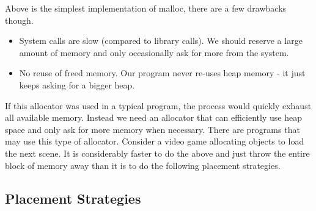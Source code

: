 Above is the simplest implementation of malloc, there are a few drawbacks though.

\begin{itemize}
\item System calls are slow (compared to library calls). We should reserve a large amount of memory and only occasionally ask for more from the system.
\item No reuse of freed memory. Our program never re-uses heap memory - it just keeps asking for a bigger heap.
\end{itemize}

If this allocator was used in a typical program, the process would quickly exhaust all available memory.
Instead we need an allocator that can efficiently use heap space and only ask for more memory when necessary.
There are programs that may use this type of allocator.
Consider a video game allocating objects to load the next scene.
It is considerably faster to do the above and just throw the entire block of memory away than it is to do the following placement strategies.

\subsection{Placement Strategies}

